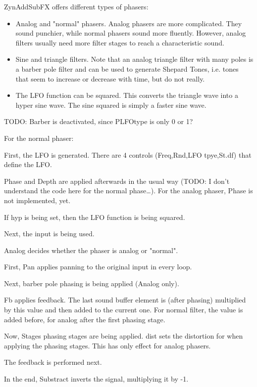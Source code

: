    ZynAddSubFX offers different types of phasers:

   \begin{itemize}
      \item Analog and "normal" phasers. Analog phasers are more complicated.
      They sound punchier, while normal phasers sound more fluently. However,
      analog filters usually need more filter stages to reach a
      characteristic sound.
      \item Sine and triangle filters. Note that an analog triangle filter
      with many poles is a barber pole filter and can be used to generate
      Shepard Tones, i.e. tones that seem to increase or decrease with time,
      but do not really.
      \item The LFO function can be squared. This converts the triangle wave
      into a hyper sine wave. The sine squared is simply a faster sine wave.
   \end{itemize}

   TODO: Barber is deactivated, since PLFOtype is only 0 or 1?

   For the normal phaser:
   
   \begin{enumber}
      \item First, the LFO is generated.
         There are 4 controls (Freq,Rnd,LFO tpye,St.df) that define the LFO.
      \item Phase and Depth are applied afterwards in the usual way (TODO: I
            don’t understand the code here for the normal phase…). For the
            analog phaser, Phase is not implemented, yet.
      \item If hyp is being set, then the LFO function is being squared.
      \item Next, the input is being used.
      \item Analog decides whether the phaser is analog or "normal".
      \item First, Pan applies panning to the original input in every loop.
      \item Next, barber pole phasing is being applied (Analog only).
      \item Fb applies feedback. The last sound buffer element is (after
            phasing) multiplied by this value and then added to the current
            one. For normal filter, the value is added before, for analog
            after the first phasing stage.
      \item Now, Stages phasing stages are being applied. dist sets the
            distortion for when applying the phasing stages. This has only
            effect for analog phasers.
      \item The feedback is performed next.
      \item In the end, Substract inverts the signal, multiplying it by -1.
   \end{enumber}

